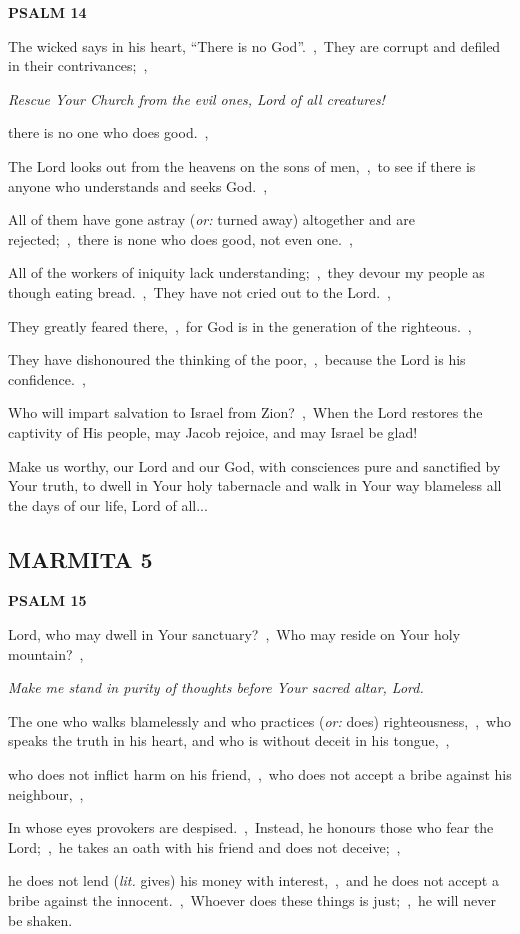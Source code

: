\documentclass[12pt,twoside,a5paper]{article}
\newcommand{\marmita}[1]{\subsection*{MARMITA {#1}}}
\newcommand{\psalm}[1]{\textbf{PSALM {#1}}}
\newcommand{\qanona}[1]{{\liturgicalhint{Qanona.} \emph{#1}}}
\newcommand{\slota}[1]{\liturgicalhint{Slota.} #1}
\newcommand{\translationoption}[1]{\emph{or:} #1}
\newcommand{\translationliteral}[1]{\emph{lit.} #1}
\begin{document}
\psalm{14}

\begin{normalparskip}
  The wicked says in his heart, ``There is no God''.~\sep\ They are corrupt and defiled in their contrivances;~\sep

  \qanona{Rescue Your Church from the evil ones, Lord of all creatures!}

  there is no one who does good.~\sep

  The Lord looks out from the heavens on the sons of men,~\sep\ to see if there is anyone who understands and seeks God.~\sep

  All of them have gone astray (\translationoption{turned away}) altogether and are rejected;~\sep\ there is none who does good, not even one.~\sep

  All of the workers of iniquity lack understanding;~\sep\ they devour my people as though eating bread.~\sep\ They have not cried out to the Lord.~\sep

  They greatly feared there,~\sep\ for God is in the generation of the righteous.~\sep

  They have dishonoured the thinking of the poor,~\sep\ because the Lord is his confidence.~\sep

  Who will impart salvation to Israel from Zion?~\sep\ When the Lord restores the captivity of His people, may Jacob rejoice, and may Israel be glad!
\end{normalparskip}

\slota{Make us worthy, our Lord and our God, with consciences pure and sanctified by Your truth, to dwell in Your holy tabernacle and walk in Your way blameless all the days of our life, Lord of all...}

\marmita{5}

\psalm{15}

\begin{normalparskip}
  Lord, who may dwell in Your sanctuary?~\sep\ Who may reside on Your holy mountain?~\sep

  \qanona{Make me stand in purity of thoughts before Your sacred altar, Lord.}

  The one who walks blamelessly and who practices (\translationoption{does}) righteousness,~\sep\ who speaks the truth in his heart, and who is without deceit in his tongue,~\sep

  who does not inflict harm on his friend,~\sep\ who does not accept a bribe against his neighbour,~\sep

  In whose eyes provokers are despised.~\sep\ Instead, he honours those who fear the Lord;~\sep\ he takes an oath with his friend and does not deceive;~\sep

  he does not lend (\translationliteral{gives}) his money with interest,~\sep\ and he does not accept a bribe against the innocent.~\sep\ Whoever does these things is just;~\sep\ he will never be shaken.
\end{normalparskip}
\end{document}

